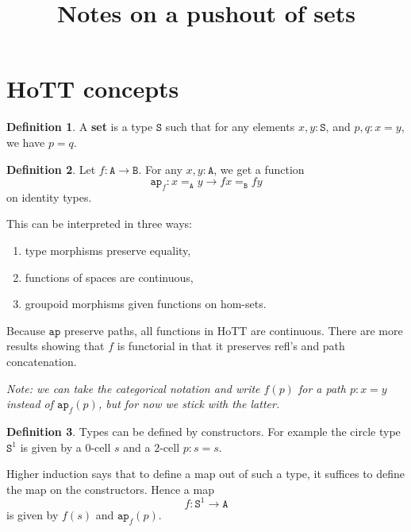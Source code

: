 \documentclass[12pt]{amsart}
\newcommand{\from}{\colon}
\newcommand{\tin}{\colon}
\newcommand{\type}[1]{\mathtt{#1}}
\newcommand{\A}{\type{A}}
\newcommand{\B}{\type{B}}
\newcommand{\ap}{\type{ap}}
\theoremstyle{remark}
\theoremstyle{definition}
\newtheorem{defn}{Definition}
\begin{document}
\title{Notes on a pushout of sets}
\maketitle

\section{HoTT concepts}

\begin{defn} %
	\label{def:set}
	A \textbf{set} is a type $ \type{S} $ such that
	for any elements $ x,y \tin \type{S} $,
	and $ p,q \tin x = y $, we have $ p = q $.
\end{defn}

\begin{defn} %
	\label{def:ap}
	Let $ f \from \type{ A } \to \B $.
	For any $ x,y \tin \type{ A } $, we get a function 
	\[
	\ap_f \from 
	x =_\A y \to fx =_\B fy
	\]
	on identity types.  
	
	This can be interpreted in three ways:
	\begin{enumerate}
		\item type morphisms preserve equality,
		\item functions of spaces are continuous,
		\item groupoid morphisms given functions
		on hom-sets.
	\end{enumerate}
	Because $ \type{ ap } $ preserve paths, 
	all functions in HoTT are continuous.
	There are more results showing that
	$ f $ is functorial in that it preserves
	refl's and path concatenation.
	
	\emph{Note: we can take the categorical
		notation and write $ f ( p ) $ for a path
		$ p \tin x = y $ instead of 
		$ \type{ ap }_f ( p ) $, 
		but for now we stick with the latter.}
\end{defn}

\begin{defn} %
	Types can be defined by constructors.
	For example the circle type $ \type{S}^1 $
	is given by a $ 0 $-cell $s$ and 
	a $ 2 $-cell $ p \tin s = s $.
	
	Higher induction says that to define
	a map out of such a type, it suffices
	to define the map on the constructors.
	Hence a map 
	\[
		f \from \type{ S }^1 \to \type{ A }
	\] 
	is given by $ f ( s ) $ and 
	$\type{ ap }_f ( p )$.
\end{defn}
\end{document}
